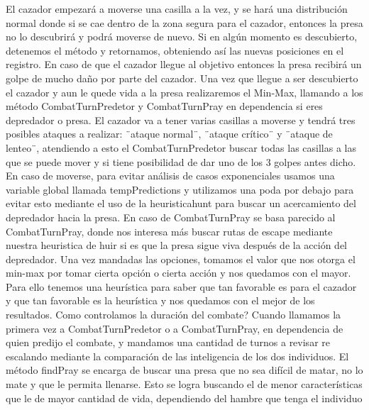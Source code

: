 \documentclass{llncs}
\begin{document}
\newline
El cazador empezará a moverse una casilla a la vez, y se hará una distribución normal donde si se cae dentro de la zona segura para el cazador, entonces la presa no lo descubrirá y podrá moverse de nuevo. Si en algún momento es descubierto, detenemos el método y retornamos, obteniendo así las nuevas posiciones en el registro. En caso de que el cazador llegue al objetivo entonces la presa recibirá un golpe de mucho daño por parte del cazador.
\newline
\newline
Una vez que llegue a ser descubierto el cazador y aun le quede vida a la presa realizaremos el Min-Max, llamando a los método CombatTurnPredetor y CombatTurnPray en dependencia si eres depredador o presa.
\newline
\newline
El cazador va a tener varias casillas a moverse y tendrá tres posibles ataques a realizar: ¨ataque normal¨, ¨ataque crítico¨ y ¨ataque de lenteo¨, atendiendo a esto el CombatTurnPredetor buscar todas las casillas a las que se puede mover y si tiene posibilidad de dar uno de los 3 golpes antes dicho. En caso de moverse, para evitar análisis de casos exponenciales usamos una variable global llamada tempPredictions y utilizamos una poda por debajo para evitar esto mediante el uso de la heuristicahunt para buscar un acercamiento del depredador hacia la presa.
\newline
\newline
En caso de CombatTurnPray se basa parecido al CombatTurnPray, donde nos interesa más buscar rutas de escape mediante nuestra heuristica de huir si es que la presa sigue viva después de la acción del depredador.
\newline
\newline
Una vez mandadas las opciones, tomamos el valor que nos otorga el min-max por tomar cierta opción o cierta acción y nos quedamos con el mayor. Para ello tenemos una heurística para saber que tan favorable es para el cazador y que tan favorable es la heurística y nos quedamos con el mejor de los resultados.
\newline
\newline
Como controlamos la duración del combate?
\newline
\newline
Cuando llamamos la primera vez a CombatTurnPredetor o a CombatTurnPray, en dependencia de quien predijo el combate, y mandamos una cantidad de turnos a revisar re escalando mediante la comparación de las inteligencia de los dos individuos.
\newline
\newline
El método findPray se encarga de buscar una presa que no sea difícil de matar, no lo mate y que le permita llenarse. Esto se logra buscando el de menor características que le de mayor cantidad de vida, dependiendo del hambre que tenga el individuo
\end{document}

